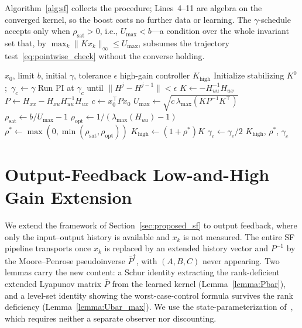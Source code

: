 \documentclass[final,5p,times,authoryear]{elsarticle}
\theoremstyle{plain}
\theoremstyle{definition}
\theoremstyle{remark}
\begin{document}
Algorithm~\ref{alg:sf} collects the procedure; Lines~4--11 are
algebra on the converged kernel, so the boost costs no further data or
learning.  The $\gamma$-schedule accepts only when
$\rho_{\mathrm{sat}} > 0$, i.e., $U_{\max} < b$---a condition over the
whole invariant set that, by
$\max_k\|Kx_k\|_\infty \leq U_{\max}$,
subsumes the trajectory test~\eqref{eq:pointwise_check} without the
converse holding.

\begin{algorithm}[!htb]
\caption{Model-Free Low-and-High Gain Q-Learning (State Feedback)}
\label{alg:sf}
{\footnotesize
\begin{algorithmic}[1]
\Require $x_0$, limit $b$, initial $\gamma$, tolerance $\epsilon$
\Ensure  high-gain controller $K_{\mathrm{high}}$
\State Initialize stabilizing $K^0$;\ $\gamma_c \leftarrow \gamma$
\Repeat
    \State Run PI at $\gamma_c$ until $\|H^j - H^{j-1}\| < \epsilon$
    \State $K \leftarrow -H_{uu}^{-1}H_{ux}$
    \State $P \leftarrow H_{xx} - H_{xu}H_{uu}^{-1}H_{ux}$
    \State $c \leftarrow x_0^\top Px_0$
    \State $U_{\max} \leftarrow \sqrt{c\,\lambda_{\max}(KP^{-1}K^\top)}$
    \State $\rho_{\mathrm{sat}} \leftarrow b/U_{\max} - 1$
    \State $\rho_{\mathrm{opt}} \leftarrow 1/(\lambda_{\max}(H_{uu})-1)$
    \State $\rho^* \leftarrow \max(0,\min(\rho_{\mathrm{sat}},\rho_{\mathrm{opt}}))$
    \State $K_{\mathrm{high}} \leftarrow (1+\rho^*)K$
    \State $\gamma_c \leftarrow \gamma_c/2$ \EndIf
{}
\State \Return $K_{\mathrm{high}}$, $\rho^*$, $\gamma_c$
\end{algorithmic}}
\end{algorithm}

\section{Output-Feedback Low-and-High Gain Extension}\label{sec:proposed_of}

We extend the framework of Section~\ref{sec:proposed_sf} to output
feedback, where only the input--output history is available and $x_k$
is not measured.  The entire SF pipeline transports once $x_k$ is
replaced by an extended history vector and $P^{-1}$ by the
Moore--Penrose pseudoinverse $\bar P^{\dagger}$, with $(A,B,C)$ never
appearing.  Two lemmas carry the new content: a Schur identity
extracting the rank-deficient extended Lyapunov matrix $\bar P$ from the
learned kernel (Lemma~\ref{lemma:Pbar}), and a level-set identity
showing the worst-case-control formula survives the rank deficiency
(Lemma~\ref{lemma:Ubar_max}).  We use the
state-parameterization of~\citet{RizviLin2023book}, which requires
neither a separate observer nor discounting.
\end{document}
